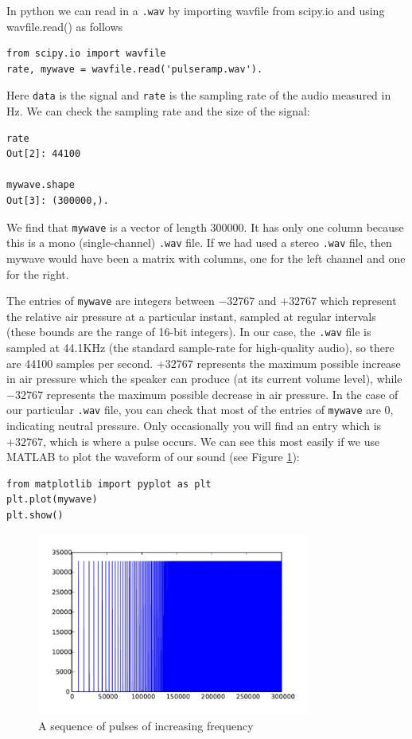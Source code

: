 In python we can read in a \texttt{.wav} by importing wavfile from scipy.io and using wavfile.read() as follows
\begin{lstlisting}
from scipy.io import wavfile
rate, mywave = wavfile.read('pulseramp.wav').
\end{lstlisting}
Here \texttt{data} is the signal and \texttt{rate} is the sampling rate of the audio measured in Hz.  We can check the sampling rate and the size of the signal:
\begin{lstlisting}
rate
Out[2]: 44100

mywave.shape
Out[3]: (300000,).
\end{lstlisting}
We find that \texttt{mywave} is a vector of length $300000$. It has only one column because this is a mono (single-channel) \texttt{.wav} file. If we had used a stereo \texttt{.wav} file, then mywave would have been a matrix with columns, one for the left channel and one for the right.

The entries of \texttt{mywave} are integers between $-32767$ and $+32767$ which represent the relative air pressure at a particular instant, sampled at regular intervals (these bounds are the range of 16-bit integers).   In our case, the \texttt{.wav} file is sampled at 44.1KHz (the standard sample-rate for high-quality audio), so there are 44100 samples per second. $+32767$ represents the maximum possible increase in air pressure which the speaker can produce (at its current volume level), while $-32767$ represents the maximum possible decrease in air pressure. In the case of our particular \texttt{.wav} file, you can check that most of the entries of \texttt{mywave} are $0$, indicating neutral pressure. Only occasionally you will find an entry which is $+32767$, which is where a pulse occurs.
We can see this most easily if we use MATLAB to plot the waveform of our sound (see Figure \ref{pulseramp}):
\begin{lstlisting}
from matplotlib import pyplot as plt
plt.plot(mywave)
plt.show()
\end{lstlisting}
\begin{figure}[ht]\caption{A sequence of pulses of increasing frequency}\label{pulseramp}\centering\includegraphics[width=90mm]{pulseramp}\end{figure}

